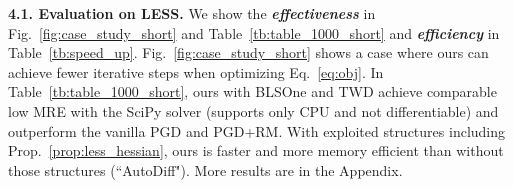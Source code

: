 \documentclass{article}
\newcommand{\textbt}[1]{\textbf{\textit{#1}}}
\theoremstyle{plain}
\theoremstyle{definition}
\theoremstyle{remark}
\begin{document}
\textbf{4.1. Evaluation on LESS.}
We show the \textbt{effectiveness} in Fig.~\ref{fig:case_study_short} and Table~\ref{tb:table_1000_short} and \textbt{efficiency} in Table~\ref{tb:speed_up}.
%
Fig.~\ref{fig:case_study_short} shows a case where ours can achieve fewer iterative steps when optimizing Eq.~\eqref{eq:obj}.
In Table~\ref{tb:table_1000_short}, ours with BLSOne and TWD achieve comparable low MRE with the SciPy solver \cite{scipy} (supports only CPU and not differentiable) and outperform the vanilla PGD and PGD+RM.
With exploited structures including Prop.~\ref{prop:less_hessian}, ours is faster and more memory efficient than without those structures (``AutoDiff").
More results are in the Appendix.

\begin{table}[!ht]
\vspace{-1mm}
\centering
\caption{\textit{With 1,000 random data from $\mathcal{N}(0,1)$.
``In" and ``Out" refer to the number of failed cases inner and outer of the sphere respectively.
``Imp." is the number of cases with FPD $\leq$ the SciPy baseline.
See the Appendix for more results.}
}
\label{tb:table_1000_short}
\setlength{\tabcolsep}{1.5pt}
\end{table}
\end{document}
